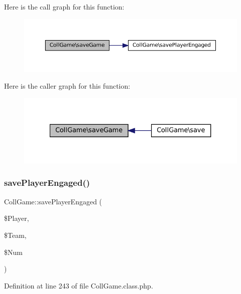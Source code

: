 Here is the call graph for this function\+:\nopagebreak
\begin{figure}[H]
\begin{center}
\leavevmode
\includegraphics[width=350pt]{class_coll_game_a957e9a00e3ce38129276f8454a242dcd_cgraph}
\end{center}
\end{figure}
Here is the caller graph for this function\+:\nopagebreak
\begin{figure}[H]
\begin{center}
\leavevmode
\includegraphics[width=327pt]{class_coll_game_a957e9a00e3ce38129276f8454a242dcd_icgraph}
\end{center}
\end{figure}
\mbox{\label{class_coll_game_a888d595abf397fe39d4d81833e92ad61}} 
\subsubsection{\texorpdfstring{save\+Player\+Engaged()}{savePlayerEngaged()}}
{\footnotesize\ttfamily Coll\+Game\+::save\+Player\+Engaged (\begin{DoxyParamCaption}\item[{}]{\$\+Player,  }\item[{}]{\$\+Team,  }\item[{}]{\$\+Num }\end{DoxyParamCaption})\hspace{0.3cm}{\ttfamily [protected]}}



Definition at line 243 of file Coll\+Game.\+class.\+php.



